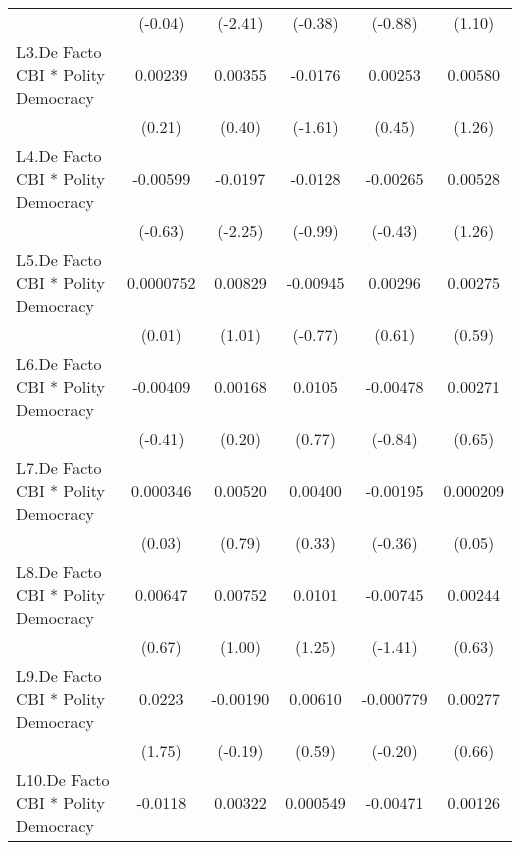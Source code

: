 {\begin{longtable}{l*{5}{c}}
                &  (-0.04)         &  (-2.41)         &  (-0.38)         &  (-0.88)         &   (1.10)         \\
[1em]
L3.De Facto CBI * Polity Democracy&  0.00239         &  0.00355         &  -0.0176         &  0.00253         &  0.00580         \\
                &   (0.21)         &   (0.40)         &  (-1.61)         &   (0.45)         &   (1.26)         \\
[1em]
L4.De Facto CBI * Polity Democracy& -0.00599         &  -0.0197\sym{*}  &  -0.0128         & -0.00265         &  0.00528         \\
                &  (-0.63)         &  (-2.25)         &  (-0.99)         &  (-0.43)         &   (1.26)         \\
[1em]
L5.De Facto CBI * Polity Democracy&0.0000752         &  0.00829         & -0.00945         &  0.00296         &  0.00275         \\
                &   (0.01)         &   (1.01)         &  (-0.77)         &   (0.61)         &   (0.59)         \\
[1em]
L6.De Facto CBI * Polity Democracy& -0.00409         &  0.00168         &   0.0105         & -0.00478         &  0.00271         \\
                &  (-0.41)         &   (0.20)         &   (0.77)         &  (-0.84)         &   (0.65)         \\
[1em]
L7.De Facto CBI * Polity Democracy& 0.000346         &  0.00520         &  0.00400         & -0.00195         & 0.000209         \\
                &   (0.03)         &   (0.79)         &   (0.33)         &  (-0.36)         &   (0.05)         \\
[1em]
L8.De Facto CBI * Polity Democracy&  0.00647         &  0.00752         &   0.0101         & -0.00745         &  0.00244         \\
                &   (0.67)         &   (1.00)         &   (1.25)         &  (-1.41)         &   (0.63)         \\
[1em]
L9.De Facto CBI * Polity Democracy&   0.0223         & -0.00190         &  0.00610         &-0.000779         &  0.00277         \\
                &   (1.75)         &  (-0.19)         &   (0.59)         &  (-0.20)         &   (0.66)         \\
[1em]
L10.De Facto CBI * Polity Democracy&  -0.0118         &  0.00322         & 0.000549         & -0.00471         &  0.00126         \\

\end{longtable}}

